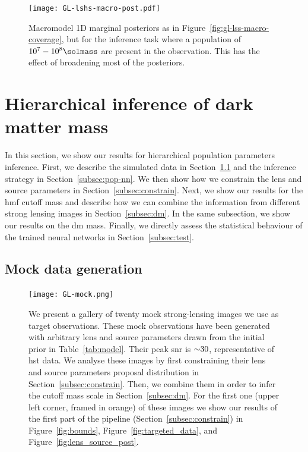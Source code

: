 \begin{figure}
    \centering
    \texttt{[image: GL-lshs-macro-post.pdf]}
    \caption{Macromodel 1D marginal posteriors as in Figure~\ref{fig:gl-lss-macro-coverage}, but for the inference task where a population of $10^7-10^8\si{\solmass}$ are present in the observation. This has the effect of broadening most of the posteriors.}
    \label{fig:gl-lshs-macro-post}
\end{figure}


\section{Hierarchical inference of dark matter mass} \label{sec:results-pop}


In this section, we show our results for hierarchical population parameters inference. First, we describe the simulated data in Section~\ref{subsec:pop-data} and the inference strategy in Section~\ref{subsec:pop-nn}. We then show how we constrain the lens and source parameters in Section~\ref{subsec:constrain}. Next, we show our results for the \gls*{hmf} cutoff mass and describe how we can combine the information from different strong lensing images in Section~\ref{subsec:dm}. In the same subsection, we show our results on the \gls*{dm} mass. Finally, we directly assess the statistical behaviour of the trained neural networks in Section~\ref{subsec:test}.

\subsection{Mock data generation}
\label{subsec:pop-data}

\begin{figure}
    \centering
    \texttt{[image: GL-mock.png]}
    \caption{We present a gallery of twenty mock strong-lensing images we use as target observations. These mock observations have been generated with arbitrary lens and source parameters drawn from the initial prior in Table~\ref{tab:model}. Their peak \gls*{snr} is $\num{\sim 30}$, representative of \gls*{hst} data. We analyse these images by first constraining their lens and source parameters proposal distribution in Section~\ref{subsec:constrain}. Then, we combine them in order to infer the cutoff mass scale in Section~\ref{subsec:dm}. For the first one (upper left corner, framed in orange) of these images we show our results of the first part of the pipeline (Section~\ref{subsec:constrain}) in Figure~\ref{fig:bounds}, Figure~\ref{fig:targeted_data}, and Figure~\ref{fig:lens_source_post}.
}
\label{fig:mock}
\end{figure}

